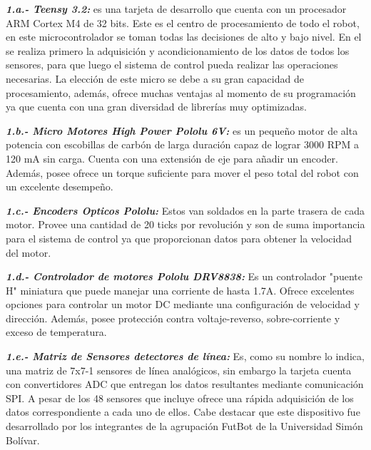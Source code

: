 \documentclass[10pt,twocolumn,legalpaper,draft]{article}
\begin{document}
\textit{\textbf{1.a.- Teensy 3.2:}}
es una tarjeta de desarrollo que cuenta con un procesador ARM Cortex M4 de 32 bits. Este es el centro de procesamiento de todo el robot, en este microcontrolador se toman todas las decisiones de alto y bajo nivel. En el se realiza primero la adquisición y acondicionamiento de los datos de todos los sensores, para que luego el sistema de control pueda realizar las operaciones necesarias. \newline \indent
La elección de este micro se debe a su gran capacidad de procesamiento, además, ofrece muchas ventajas al momento de su programación ya que cuenta con una gran diversidad de librerías muy optimizadas.\newline

\textit{\textbf{1.b.- Micro Motores High Power Pololu 6V:}}
es un pequeño motor de alta potencia con escobillas de carbón de larga duración capaz de lograr 3000 RPM a 120 mA sin carga. Cuenta con una extensión de eje para añadir un encoder. Además, posee ofrece un torque suficiente para mover el peso total del robot con un excelente desempeño.\newline

\textit{\textbf{1.c.- Encoders Opticos Pololu:}}
Estos van soldados en la parte trasera de cada motor. Provee una cantidad de 20 ticks por revolución y son de suma importancia para el sistema de control ya que proporcionan datos para obtener la velocidad del motor.\newline

\textit{\textbf{1.d.- Controlador de motores Pololu DRV8838:}}
Es un controlador "puente H" miniatura que puede manejar una corriente de hasta 1.7A. Ofrece excelentes opciones para controlar un motor DC mediante una configuración de velocidad y dirección. Además, posee protección contra voltaje-reverso, sobre-corriente y exceso de temperatura.\newline

\textit{\textbf{1.e.- Matriz de Sensores detectores de línea:}}
Es, como su nombre lo indica, una matriz de 7x7-1 sensores de línea analógicos, sin embargo la tarjeta cuenta con convertidores ADC que entregan los datos resultantes mediante comunicación SPI. A pesar de los 48 sensores que incluye ofrece una rápida adquisición de los datos correspondiente a cada uno de ellos. Cabe destacar que este dispositivo fue desarrollado por los integrantes de la agrupación FutBot de la Universidad Simón Bolívar.\newline
\end{document}
